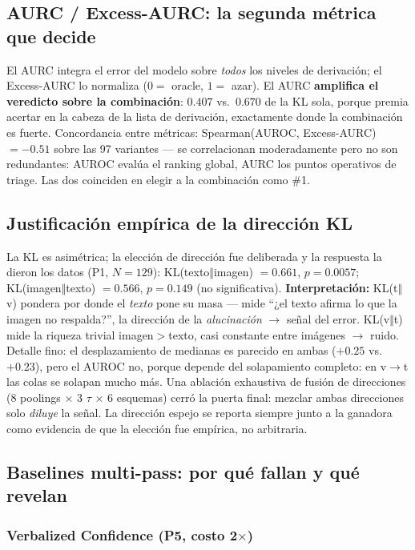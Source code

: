 \documentclass[12pt,a4paper]{article}
\begin{document}
\subsection{AURC / Excess-AURC: la segunda métrica que decide}
\label{sec:aurc}

El AURC integra el error del modelo sobre \emph{todos} los niveles de
derivación; el Excess-AURC lo normaliza ($0 =$ oracle, $1 =$ azar). El
AURC \textbf{amplifica el veredicto sobre la combinación}: $0.407$ vs.\
$0.670$ de la KL sola, porque premia acertar en la cabeza de la lista de
derivación, exactamente donde la combinación es fuerte. Concordancia
entre métricas: Spearman(AUROC, Excess-AURC) $= -0.51$ sobre las 97
variantes --- se correlacionan moderadamente pero no son redundantes:
AUROC evalúa el ranking global, AURC los puntos operativos de triage. Las
dos coinciden en elegir a la combinación como \#1.

\subsection{Justificación empírica de la dirección KL}
\label{sec:direccion}

La KL es asimétrica; la elección de dirección fue deliberada y la respuesta
la dieron los datos (P1, $N = 129$): KL(texto$\Vert$imagen) $= 0.661$,
$p = 0.0057$; KL(imagen$\Vert$texto) $= 0.566$, $p = 0.149$ (no
significativa). \textbf{Interpretación:} KL(t$\Vert$v) pondera por donde
el \emph{texto} pone su masa --- mide ``¿el texto afirma lo que la imagen
no respalda?'', la dirección de la \emph{alucinación} $\to$ señal del
error. KL(v$\Vert$t) mide la riqueza trivial imagen$>$texto, casi
constante entre imágenes $\to$ ruido. Detalle fino: el desplazamiento de
medianas es parecido en ambas ($+0.25$ vs.\ $+0.23$), pero el AUROC no,
porque depende del solapamiento completo: en v$\to$t las colas se solapan
mucho más. Una ablación exhaustiva de fusión de direcciones (8 poolings
$\times$ 3 $\tau$ $\times$ 6 esquemas) cerró la puerta final: mezclar
ambas direcciones solo \emph{diluye} la señal. La dirección espejo se
reporta siempre junto a la ganadora como evidencia de que la elección fue
empírica, no arbitraria.

\subsection{Baselines multi-pass: por qué fallan y qué revelan}
\label{sec:multipass}

\subsubsection{Verbalized Confidence (P5, costo 2$\times$)}
\end{document}
